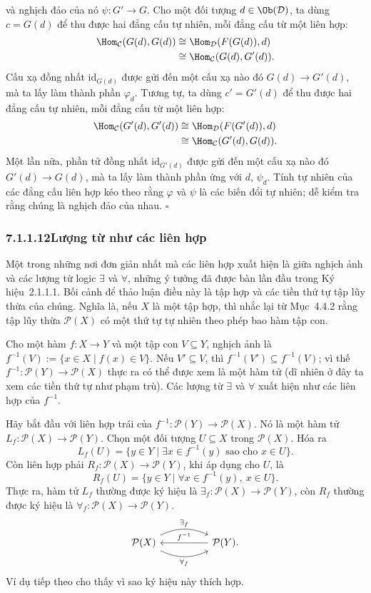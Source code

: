 và nghịch đảo của nó $\psi:G'\to G$. Cho một đối tượng $d\in\Ob(\mathcal D)$, ta dùng $c=G(d)$ để thu được hai đẳng cấu tự nhiên, mỗi đẳng cấu từ một liên hợp:
\[
\begin{aligned}
\Hom_{\mathcal C}(G(d),G(d))&\cong\Hom_{\mathcal D}(F(G(d)),d)\\
&\cong\Hom_{\mathcal C}(G(d),G'(d)).
\end{aligned}
\]
Cấu xạ đồng nhất $\mathrm{id}_{G(d)}$ được gửi đến một cấu xạ nào đó $G(d)\to G'(d)$, mà ta lấy làm thành phần $\varphi_d$. Tương tự, ta dùng $c'=G'(d)$ để thu được hai đẳng cấu tự nhiên, mỗi đẳng cấu từ một liên hợp:
\[
\begin{aligned}
\Hom_{\mathcal C}(G'(d),G'(d))&\cong\Hom_{\mathcal D}(F(G'(d)),d)\\
&\cong\Hom_{\mathcal C}(G'(d),G(d)).
\end{aligned}
\]
Một lần nữa, phần tử đồng nhất $\mathrm{id}_{G'(d)}$ được gửi đến một cấu xạ nào đó $G'(d)\to G(d)$, mà ta lấy làm thành phần ứng với $d$, $\psi_d$. Tính tự nhiên của các đẳng cấu liên hợp kéo theo rằng $\varphi$ và $\psi$ là các biến đổi tự nhiên; dễ kiểm tra rằng chúng là nghịch đảo của nhau.
\hfill$\square$

\subsubsection*{7.1.1.12\quad Lượng từ như các liên hợp}

Một trong những nơi đơn giản nhất mà các liên hợp xuất hiện là giữa nghịch ảnh và các lượng từ logic $\exists$ và $\forall$, những ý tưởng đã được bàn lần đầu trong Ký hiệu~2.1.1.1. Bối cảnh để thảo luận điều này là tập hợp và các tiền thứ tự tập lũy thừa của chúng. Nghĩa là, nếu $X$ là một tập hợp, thì nhắc lại từ Mục~4.4.2 rằng tập lũy thừa $\mathcal P(X)$ có một thứ tự tự nhiên theo phép bao hàm tập con.

Cho một hàm $f:X\to Y$ và một tập con $V\subseteq Y$, nghịch ảnh là $f^{-1}(V):=\{x\in X\mid f(x)\in V\}$. Nếu $V'\subseteq V$, thì $f^{-1}(V')\subseteq f^{-1}(V)$; vì thế $f^{-1}:\mathcal P(Y)\to\mathcal P(X)$ thực ra có thể được xem là một hàm tử (dĩ nhiên ở đây ta xem các tiền thứ tự như phạm trù). Các lượng từ $\exists$ và $\forall$ xuất hiện như các liên hợp của $f^{-1}$.

Hãy bắt đầu với liên hợp trái của $f^{-1}:\mathcal P(Y)\to\mathcal P(X)$. Nó là một hàm tử $L_f:\mathcal P(X)\to\mathcal P(Y)$. Chọn một đối tượng $U\subseteq X$ trong $\mathcal P(X)$. Hóa ra
\[
L_f(U)=\{y\in Y\mid\exists x\in f^{-1}(y)\text{ sao cho }x\in U\}.
\]
Còn liên hợp phải $R_f:\mathcal P(X)\to\mathcal P(Y)$, khi áp dụng cho $U$, là
\[
R_f(U)=\{y\in Y\mid\forall x\in f^{-1}(y),\ x\in U\}.
\]
Thực ra, hàm tử $L_f$ thường được ký hiệu là $\exists_f:\mathcal P(X)\to\mathcal P(Y)$, còn $R_f$ thường được ký hiệu là $\forall_f:\mathcal P(X)\to\mathcal P(Y)$.
\[
\begin{tikzcd}[column sep=huge]
\mathcal P(X)\arrow[r,bend left=25,"\exists_f"]\arrow[r,bend right=25,"\forall_f"']&\mathcal P(Y)\arrow[l,"f^{-1}"'].
\end{tikzcd}
\]
Ví dụ tiếp theo cho thấy vì sao ký hiệu này thích hợp.

